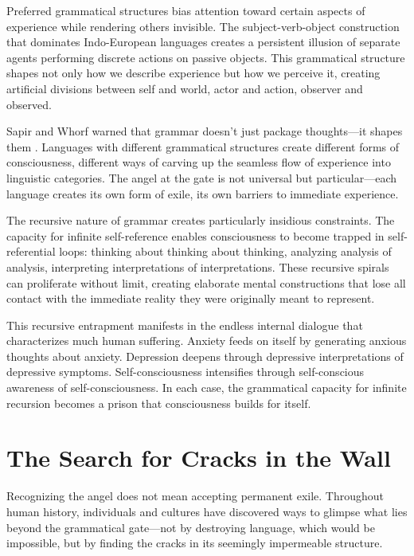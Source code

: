 Preferred grammatical structures bias attention toward certain aspects of experience while rendering others invisible. The subject-verb-object construction that dominates Indo-European languages creates a persistent illusion of separate agents performing discrete actions on passive objects. This grammatical structure shapes not only how we describe experience but how we perceive it, creating artificial divisions between self and world, actor and action, observer and observed.

Sapir and Whorf warned that grammar doesn't just package thoughts—it shapes them \parencite{sapir1929status,whorf1956language}. Languages with different grammatical structures create different forms of consciousness, different ways of carving up the seamless flow of experience into linguistic categories. The angel at the gate is not universal but particular—each language creates its own form of exile, its own barriers to immediate experience.

The recursive nature of grammar creates particularly insidious constraints. The capacity for infinite self-reference enables consciousness to become trapped in self-referential loops: thinking about thinking about thinking, analyzing analysis of analysis, interpreting interpretations of interpretations. These recursive spirals can proliferate without limit, creating elaborate mental constructions that lose all contact with the immediate reality they were originally meant to represent.

This recursive entrapment manifests in the endless internal dialogue that characterizes much human suffering. Anxiety feeds on itself by generating anxious thoughts about anxiety. Depression deepens through depressive interpretations of depressive symptoms. Self-consciousness intensifies through self-conscious awareness of self-consciousness. In each case, the grammatical capacity for infinite recursion becomes a prison that consciousness builds for itself.

\section{The Search for Cracks in the Wall}

Recognizing the angel does not mean accepting permanent exile. Throughout human history, individuals and cultures have discovered ways to glimpse what lies beyond the grammatical gate—not by destroying language, which would be impossible, but by finding the cracks in its seemingly impermeable structure.


